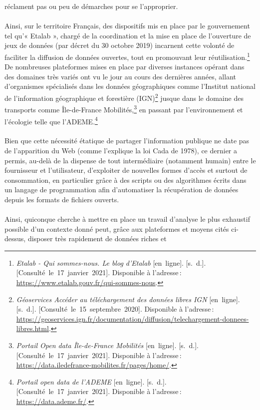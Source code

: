 \documentclass[
  11pt,
  french,
]{article}
\begin{document}
réclament pas ou peu de démarches pour se l'approprier.\\
~\\
Ainsi, sur le territoire Français, des dispositifs mis en place par le
gouvernement tel qu'« Etalab », chargé de la coordination et la mise en
place de l'ouverture de jeux de données (par décret du 30 octobre 2019)
incarnent cette volonté de faciliter la diffusion de données ouvertes,
tout en promouvant leur réutilisation.\footnote{\emph{Etalab - Qui
  sommes-nous. Le blog d'Etalab} {[}en~ligne{]}. {[}s.~d.{]}.
  {[}Consulté~le~17~janvier~2021{]}. Disponible à l'adresse\,:
  \url{https://www.etalab.gouv.fr/qui-sommes-nous}.} De nombreuses
plateformes mises en place par diverses instances opérant dans des
domaines très variés ont vu le jour au cours des dernières années,
allant d'organismes spécialisés dans les données géographiques comme
l'Institut national de l'information géographique et forestière
(IGN)\footnote{\emph{Géoservices \textbar{} Accéder au téléchargement
  des données libres IGN} {[}en~ligne{]}. {[}s.~d.{]}.
  {[}Consulté~le~15~septembre~2020{]}. Disponible à l'adresse\,:
  \url{https://geoservices.ign.fr/documentation/diffusion/telechargement-donnees-libres.html}.}
jusque dans le domaine des transports comme Île-de-France
Mobilités,\footnote{\emph{Portail Open data Île-de-France Mobilités}
  {[}en~ligne{]}. {[}s.~d.{]}. {[}Consulté~le~17~janvier~2021{]}.
  Disponible à l'adresse\,:
  \url{https://data.iledefrance-mobilites.fr/pages/home/}.} en passant
par l'environnement et l'écologie telle que l'ADEME.\footnote{\emph{Portail
  open data de l'ADEME} {[}en~ligne{]}. {[}s.~d.{]}.
  {[}Consulté~le~17~janvier~2021{]}. Disponible à l'adresse\,:
  \url{https://data.ademe.fr/}.}\\
~\\
Bien que cette nécessité étatique de partager l'information publique ne
date pas de l'apparition du Web (comme l'explique la loi Cada de 1978),
ce dernier a permis, au-delà de la dispense de tout intermédiaire
(notamment humain) entre le fournisseur et l'utilisateur, d'exploiter de
nouvelles formes d'accès et surtout de consommation, en particulier
grâce à des scripts ou des algorithmes écrits dans un langage de
programmation afin d'automatiser la récupération de données depuis les
formats de fichiers ouverts.\\
~\\
Ainsi, quiconque cherche à mettre en place un travail d'analyse le plus
exhaustif possible d'un contexte donné peut, grâce aux plateformes et
moyens cités ci-dessus, disposer très rapidement de données riches et
\end{document}
